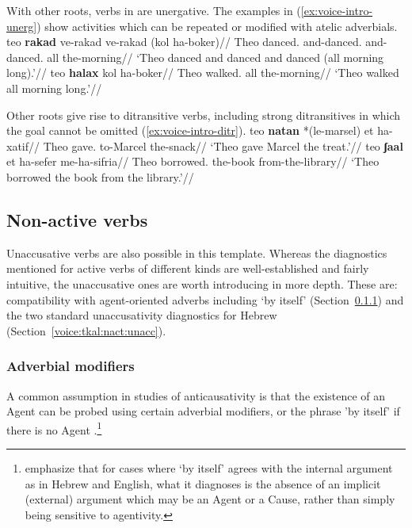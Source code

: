 With other roots, verbs in {\tkal} are unergative. The examples in (\ref{ex:voice-intro-unerg}) show activities which can be repeated or modified with atelic adverbials.
\pex\label{ex:voice-intro-unerg}
	\a \begingl
		\gla teo \textbf{rakad} ve-rakad ve-rakad (kol ha-boker)//
		\glb Theo danced. and-danced. and-danced. all the-morning//
		\glft `Theo danced and danced and danced (all morning long).'//
	\endgl
	\a \begingl
		\gla teo \textbf{halax} kol ha-boker//
		\glb Theo walked. all the-morning//
		\glft `Theo walked all morning long.'//
	\endgl
\xe

Other roots give rise to ditransitive verbs, including strong ditransitives in which the goal cannot be omitted (\ref{ex:voice-intro-ditr}).
\pex\label{ex:voice-intro-ditr}
	\a \begingl
		\gla teo \textbf{natan} *(le-marsel) et ha-xatif//
		\glb Theo gave. to-Marcel   the-snack//
		\glft `Theo gave Marcel the treat.'//
	\endgl
	\a \begingl
		\gla teo \textbf{ʃaal} et ha-sefer me-ha-sifria//
		\glb Theo borrowed.  the-book from-the-library//
		\glft `Theo borrowed the book from the library.'//
	\endgl
\xe

	\subsection{Non-active verbs} \label{voice:tkal:nact}
Unaccusative verbs are also possible in this template. Whereas the diagnostics mentioned for active verbs of different kinds are well-established and fairly intuitive, the unaccusative ones are worth introducing in more depth. These are: compatibility with agent-oriented adverbs including `by itself’ (Section~\ref{voice:tkal:nact:adv}) and the two standard unaccusativity diagnostics for Hebrew (Section~\ref{voice:tkal:nact:unacc}).

		\subsubsection{Adverbial modifiers} \label{voice:tkal:nact:adv}
A common assumption in studies of anticausativity is that the existence of an Agent can be probed using certain adverbial modifiers, or the phrase 'by itself' if there is no Agent \citep{unaccusativity95,alexiadouanagnostopoulou04,layering15,alexiadoudoron12,koontzgarboden09,kastner17gjgl}.\footnote{\cite{layering15} emphasize that for cases where `by itself' agrees with the internal argument as in Hebrew and English, what it diagnoses is the absence of an implicit (external) argument which may be an Agent or a Cause, rather than simply being sensitive to agentivity.} 

